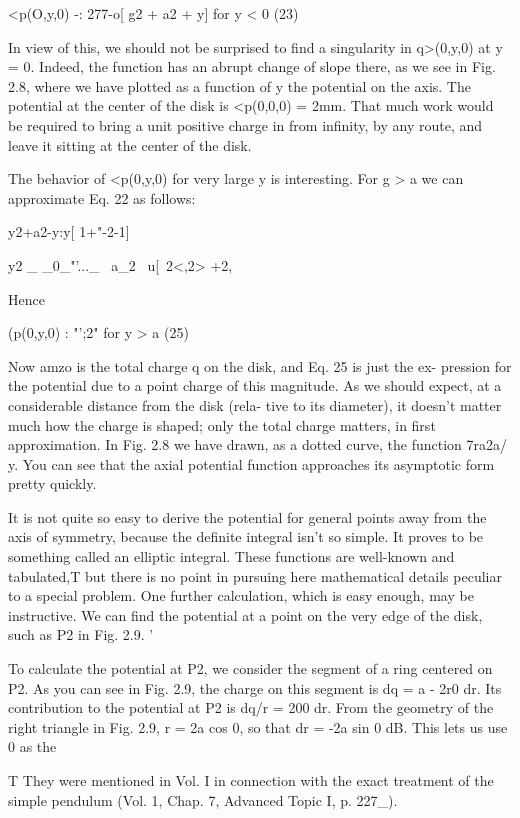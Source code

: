 <p(O,y,0) -: 277-o[ \/g2 + a2 + y] for y < 0 (23)

In view of this, we should not be surprised to find a singularity in
q>(0,y,0) at y = 0. Indeed, the function has an abrupt change of
slope there, as we see in Fig. 2.8, where we have plotted as a function
of y the potential on the axis. The potential at the center of the disk
is <p(0,0,0) = 2mm. That much work would be required to bring a
unit positive charge in from infinity, by any route, and leave it sitting
at the center of the disk.

The behavior of <p(0,y,0) for very large y is interesting. For g > a
we can approximate Eq. 22 as follows:

\/y2+a2-y:y[ 1+"-2-1]

y2
_ _0_"'..._ ~a_2
~u[~2<,2> +2, 

Hence

(p(0,y,0) : "';2" for y > a (25)

Now amzo is the total charge q on the disk, and Eq. 25 is just the ex-
pression for the potential due to a point charge of this magnitude.
As we should expect, at a considerable distance from the disk (rela-
tive to its diameter), it doesn't matter much how the charge is shaped;
only the total charge matters, in first approximation. In Fig. 2.8 we
have drawn, as a dotted curve, the function 7ra2a/ y. You can see that
the axial potential function approaches its asymptotic form pretty
quickly.

It is not quite so easy to derive the potential for general points
away from the axis of symmetry, because the definite integral isn't so
simple. It proves to be something called an elliptic integral. These
functions are well-known and tabulated,T but there is no point in
pursuing here mathematical details peculiar to a special problem.
One further calculation, which is easy enough, may be instructive.
We can find the potential at a point on the very edge of the disk, such
as P2 in Fig. 2.9. '

To calculate the potential at P2, we consider the segment of a ring
centered on P2. As you can see in Fig. 2.9, the charge on this segment
is dq = a - 2r0 dr. Its contribution to the potential at P2 is
dq/r = 200 dr. From the geometry of the right triangle in Fig. 2.9,
r = 2a cos 0, so that dr = -2a sin 0 dB. This lets us use 0 as the

T They were mentioned in Vol. I in connection with the exact treatment of the simple
pendulum (Vol. 1, Chap. 7, Advanced Topic I, p. 227_).

